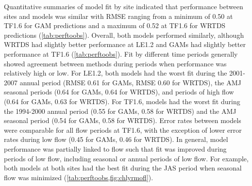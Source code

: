 \documentclass[letterpaper,12pt,oneside]{article}\usepackage[]{graphicx}\usepackage[]{color}
\begin{document}
Quantitative summaries of model fit by site indicated that performance between sites and models was similar with \ac{RMSE} ranging from a minimum of 0.50 at TF1.6 for \ac{GAM} predictions and a maximum of 0.52 at TF1.6 for \ac{WRTDS} predictions (\cref{tab:perftoobs}).  Overall, both models performed similarly, although \ac{WRTDS} had slightly better performance at LE1.2 and \acp{GAM} had slightly better performance at TF1.6 (\cref{tab:perftoobs}).  Fit by different time periods generally showed agreement between methods during periods when performance was relatively high or low.  For LE1.2, both models had the worst fit during the 2001-2007 annual period (\ac{RMSE} 0.61 for \acp{GAM}, \ac{RMSE} 0.60 for \ac{WRTDS}), the \ac{AMJ} seasonal periods (0.64 for \acp{GAM}, 0.64 for \ac{WRTDS}), and periods of high flow (0.64 for \acp{GAM}, 0.63 for \ac{WRTDS}).  For TF1.6, models had the worst fit during the 1994-2000 annual period (0.55 for \acp{GAM}, 0.58 for \ac{WRTDS}) and the \ac{AMJ} seasonal period (0.54 for \acp{GAM}, 0.58 for \ac{WRTDS}).  Error rates between models were comparable for all flow periods at TF1.6, with the exception of lower error rates during low flow (0.45 for \acp{GAM}, 0.46 for \ac{WRTDS}).  In general, model performance was partially linked to flow such that fit was improved during periods of low flow, including seasonal or annual periods of low flow.  For example, both models at both sites had the best fit during the \ac{JAS} period when seasonal flow was minimized (\cref{tab:perftoobs,fig:chlyrmofl}).
\end{document}
